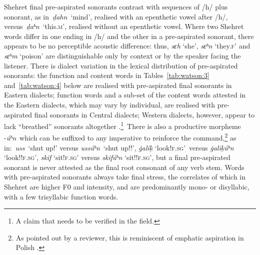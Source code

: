 \documentclass[output=paper]{langscibook}
\begin{document}
\sloppy
Shehret final pre-aspirated sonorants contrast with sequences of \mbox{/h/} plus sonorant, as in~\textit{ḏahn}~‘mind’, realised with an epenthetic vowel after \mbox{/h/}, versus~\textit{ḏaʰn}~‘this.\textsc{m}’, realised without an epenthetic vowel. Where two Shehret words differ in one ending in \mbox{/h/} and the other in a pre-aspirated sonorant, there appears to be no perceptible acoustic difference: thus, \textit{sɛh} ‘she’, \textit{sɛʰn} ‘they.\textsc{f}’ and \textit{sɛʰm} ‘poison’ are distinguishable only by context or by the speaker facing the listener. {There is dialect variation in the lexical distribution of pre-aspirated sonorants: the function and content words in Tables~\ref{tab:watson:3} and~\ref{tab:watson:4} below are realised with pre-aspirated final sonorants in Eastern dialects; function words and a sub-set of the content words attested in the Eastern dialects, which may vary by individual, are realised with pre-aspirated final sonorants in Central dialects; Western dialects, however, appear to lack ``breathed'' sonorants altogether \citep{AlMašani2014}.}\footnote{A claim that needs to be verified in the field.}{~}There is also a productive morpheme -\textit{úʰn}~which can be suffixed to any imperative to reinforce the command,\footnote{As pointed out by a reviewer, this is reminiscent of emphatic aspiration in Polish \citep{Klimczak2011}.} as in:~\textit{uss}~‘shut up!’ versus \textit{ussúʰn}~‘shut up!!’, \textit{\.galíḳ} ‘look!\textsc{f.sg}’~versus \textit{\.galiḳúʰn} ‘look!!\textsc{f.sg}’, \textit{skif} ‘sit!\textsc{f.sg}’ versus \textit{skifúʰn} ‘sit!!\textsc{f.sg}’, but a final pre-aspirated sonorant is never attested as the final root consonant of any verb stem. Words with pre-aspirated sonorants always take final stress, the correlates of which in Shehret are higher F0 and intensity, and are predominantly mono- or disyllabic, with a few trisyllabic function words.
\end{document}
